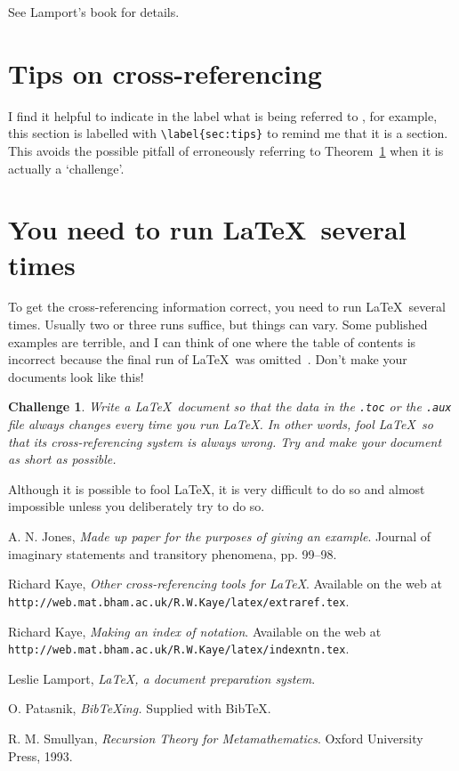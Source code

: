 \documentclass[a4paper]{article}
\newtheorem{chall}[thm]{Challenge}
\begin{document}
See Lamport's book \cite{latexbook} for details.

\section{Tips on cross-referencing}\label{sec:tips}

I find it helpful to indicate in the label what is being referred
to , for example, this section is labelled with \verb|\label{sec:tips}|
to remind me that it is a section.  This avoids the possible
pitfall of erroneously referring to Theorem~\ref{doesnotconverge}
when it is actually a `challenge'.

\section{You need to run \LaTeX\ several times}

To get the cross-referencing information correct, you
need to run \LaTeX\ several times.  Usually two or three
runs suffice, but things can vary. Some published examples 
are terrible, and I can think of one where the table
of contents is incorrect because the final run of \LaTeX\
was omitted~\cite{smullyan}. Don't make your documents 
look like this!

\begin{chall}\label{doesnotconverge}  Write a
\LaTeX\ document so that the data in the \texttt{.toc}
or the \texttt{.aux} file always changes every time you run \LaTeX.
In other words, fool \LaTeX\ so that its cross-referencing
system is always wrong. Try and make your document as short as possible.
\end{chall}

Although it is possible to fool \LaTeX, it is very difficult to
do so and almost impossible unless you deliberately try to do so.

\begin{thebibliography}{9}%

 A. N. Jones, {\it Made up paper for the purposes of giving
an example}.  Journal of imaginary statements and  transitory phenomena,
pp. 99--98.

 Richard Kaye, {\it Other cross-referencing tools for \LaTeX}.
Available on the web at \texttt{http://web.mat.bham.ac.uk/R.W.Kaye/latex/extraref.tex}.

 Richard Kaye, {\it Making an index of notation}.
Available on the web at \texttt{http://web.mat.bham.ac.uk/R.W.Kaye/latex/indexntn.tex}.

 Leslie Lamport, {\it \LaTeX, a document preparation 
system}.

 O. Patasnik, {\it Bib\TeX{}ing.}  Supplied with
{\sc Bib}\TeX.

 R. M. Smullyan, {\it Recursion Theory for Metamathematics}.
Oxford University Press, 1993.

\end{thebibliography}
\end{document}
